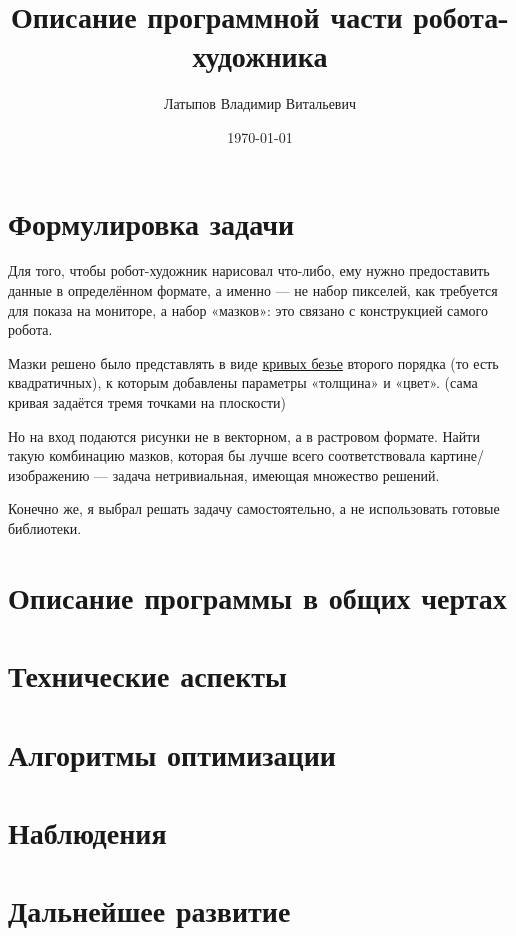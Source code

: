 \documentclass[11pt]{article}
\title{Описание программной части робота-художника}
\author{Латыпов Владимир Витальевич}
\date{\today}
\begin{document}
    \maketitle
    \newpage
    \tableofcontents
    \newpage

    \section{Формулировка задачи}\label{sec:formulating_task}

    Для того, чтобы робот-художник нарисовал что-либо, ему нужно предоставить данные в определённом формате, а именно — не набор пикселей,
    как требуется для показа на мониторе, а набор «мазков»: это связано с конструкцией самого робота.

    Мазки решено было представлять в виде \href{https://en.wikipedia.org/wiki/B\%C3\%A9zier_curve}{кривых безье} второго порядка (то есть квадратичных), к которым добавлены параметры «толщина» и «цвет».
    (сама кривая задаётся тремя точками на плоскости)

    Но на вход подаются рисунки не в векторном, а в растровом формате.
    Найти такую комбинацию мазков, которая бы лучше всего соответствовала картине/изображению — задача нетривиальная, имеющая множество решений.

    Конечно же, я выбрал решать задачу самостоятельно, а не использовать готовые библиотеки.

    \section{Описание программы в общих чертах}\label{sec:general_description}
    

    \section{Технические аспекты}\label{sec:tecnical}
    

    \section {Алгоритмы оптимизации}\label{sec:opimization_algorithms}
    

    \section{Наблюдения}\label{sec:observations}
    

    \section{Дальнейшее развитие}\label{sec:todo}
    
\end{document}
